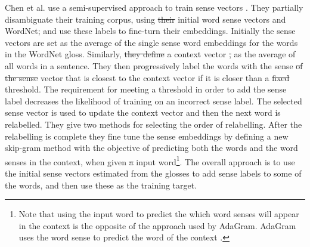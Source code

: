 \documentclass{sig-alternate}
\providecommand{\DIFadd}[1]{{\protect\color{blue}\uwave{#1}}} %
\providecommand{\DIFdel}[1]{{\protect\color{red}\sout{#1}}}                      %
\providecommand{\DIFaddbegin}{} %
\providecommand{\DIFaddend}{} %
\providecommand{\DIFdelbegin}{} %
\providecommand{\DIFdelend}{} %
\begin{document}
Chen et al. \DIFaddbegin \parencite{Chen2014} \DIFaddend use a semi-supervised approach to train sense vectors\DIFdelbegin %
\DIFdelend . They partially disambiguate their training corpus, using \DIFdelbegin \DIFdel{their }\DIFdelend initial word sense vectors and WordNet; and use these labels to fine-turn their embeddings.
Initially the sense vectors are set as the average of the single sense word embeddings \parencite{mikolov2013efficient} for the words in the WordNet gloss.
Similarly, \DIFdelbegin \DIFdel{they define }\DIFdelend a context vector \DIFdelbegin \DIFdel{, }\DIFdelend \DIFaddbegin \DIFadd{is defined }\DIFaddend as the average of all words in a sentence.
They then progressively label the words with the sense \DIFdelbegin \DIFdel{of the sense }\DIFdelend vector that is closest to the context vector if it is closer than a \DIFdelbegin \DIFdel{fixed }\DIFdelend \DIFaddbegin \DIFadd{predefined }\DIFaddend threshold.
The requirement for meeting a threshold in order to add the sense label  decreases the likelihood of training on an incorrect sense label.
The selected sense vector is used to update the context vector and then the next word is relabelled. They give two methods for selecting the order of relabelling.
After the relabelling is complete they fine tune the sense embeddings by defining a new skip-gram method with the objective of predicting both the words and the word senses in the context, when given \DIFdelbegin \DIFdel{a }\DIFdelend \DIFaddbegin \DIFadd{an }\DIFaddend input word\footnote{Note that using the input word to predict the which word senses will appear in the context is the opposite of the approach used by AdaGram. AdaGram uses the word sense to predict the word of the context \parencite{AdaGrams}.}. The overall approach is to use the initial sense vectors estimated from the glosses to add sense labels to some of the words, and then use these as the training target.
\end{document}
